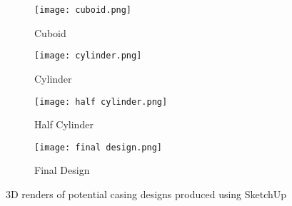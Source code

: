 \begin{figure}[htbp]
	\centering
	\begin{subfigure}[b]{0.4\linewidth}
		\texttt{[image: cuboid.png]}
		\caption{Cuboid}
		\label{fig: cuboid}
	\end{subfigure}
	\begin{subfigure}[b]{0.4\linewidth}
		\texttt{[image: cylinder.png]}
		\caption{Cylinder}
		\label{fig: cylinder}
	\end{subfigure}
	\begin{subfigure}[b]{0.4\linewidth}
		\texttt{[image: half cylinder.png]}
		\caption{Half Cylinder}
		\label{fig: half cylinder}
	\end{subfigure}
	\begin{subfigure}[b]{0.4\linewidth}
		\texttt{[image: final design.png]}
		\caption{Final Design}
		\label{fig: final design}
	\end{subfigure}
	\caption{3D renders of potential casing designs produced using SketchUp \cite{sketchup}}
	\label{fig: casings}
\end{figure}

